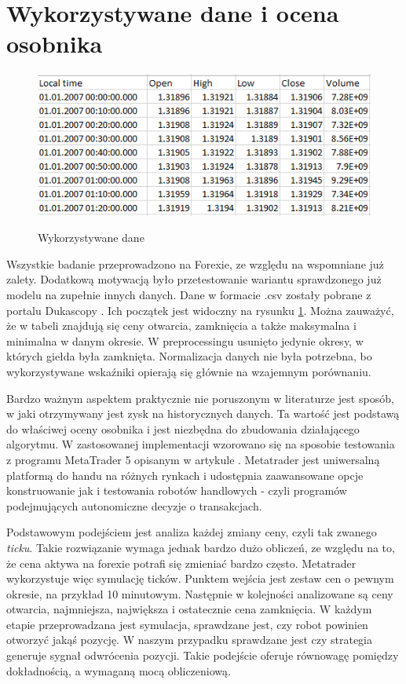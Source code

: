 \documentclass[twoside]{iisthesis}
\begin{document}
\section {Wykorzystywane dane i ocena osobnika}

\begin{figure}[h]
\center
\caption {Wykorzystywane dane}
\includegraphics{data}
\label{fig:data}
\end{figure}

Wszystkie badanie przeprowadzono na Forexie, ze względu na wspomniane już zalety. Dodatkową motywacją było przetestowanie wariantu sprawdzonego już modelu na zupełnie innych danych. Dane w formacie .csv zostały pobrane z portalu Dukascopy \cite{data}. Ich początek jest widoczny na rysunku \ref{fig:data}. Można zauważyć, że w tabeli znajdują się ceny otwarcia, zamknięcia a także maksymalna i minimalna w danym okresie. W preprocessingu usunięto jedynie okresy, w których giełda była zamknięta. Normalizacja danych nie była potrzebna, bo wykorzystywane wskaźniki opierają się głównie na wzajemnym porównaniu.

Bardzo ważnym aspektem praktycznie nie poruszonym w literaturze jest sposób, w jaki otrzymywany jest zysk na historycznych danych. Ta wartość jest podstawą do właściwej oceny osobnika i jest niezbędna do zbudowania działającego algorytmu. W zastosowanej implementacji wzorowano się na sposobie testowania z programu MetaTrader 5 opisanym w artykule \cite{metatrader}. Metatrader jest uniwersalną platformą do handu na różnych rynkach i udostępnia zaawansowane opcje konstruowanie jak i testowania robotów handlowych - czyli programów podejmujących autonomiczne decyzje o transakcjach. 

Podstawowym podejściem jest analiza każdej zmiany ceny, czyli tak zwanego \textit{ticku}. Takie rozwiązanie wymaga jednak bardzo dużo obliczeń, ze względu na to, że cena aktywa na forexie potrafi się zmieniać bardzo często. Metatrader wykorzystuje więc symulację ticków. Punktem wejścia jest zestaw cen o pewnym okresie, na przykład 10 minutowym. Następnie w kolejności analizowane są ceny otwarcia, najmniejsza, największa i ostatecznie cena zamknięcia. W każdym etapie przeprowadzana jest symulacja, sprawdzane jest, czy robot powinien otworzyć jakąś pozycję. W naszym przypadku sprawdzane jest czy strategia generuje sygnał odwrócenia pozycji. Takie podejście oferuje równowagę pomiędzy dokładnością, a wymaganą mocą obliczeniową.
\end{document}
